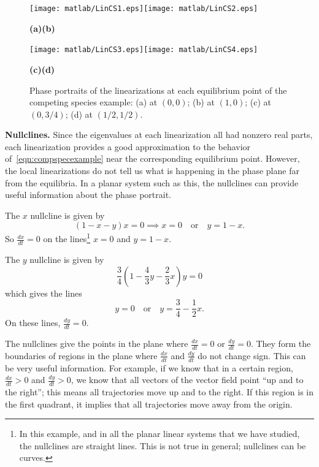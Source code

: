 \documentclass[reqno]{immbook}
\numberwithin{equation}{chapter}
\numberwithin{question}{section}
\numberwithin{theorem}{chapter}
\numberwithin{figure}{chapter}
\theoremstyle{definition}
\begin{document}

\begin{figure}
\centerline{\texttt{[image: matlab/LinCS1.eps]}\texttt{[image: matlab/LinCS2.eps]}}
\vspace{-0.2in}
\centerline{\hspace{0.2in}\textbf{(a)}\hspace{2.1in}\textbf{(b)}}
\centerline{\texttt{[image: matlab/LinCS3.eps]}\texttt{[image: matlab/LinCS4.eps]}}
\vspace{-0.2in}
\centerline{\hspace{0.2in}\textbf{(c)}\hspace{2.1in}\textbf{(d)}}
\caption{Phase portraits of the linearizations at each equilibrium point
of the competing species example:
(a) at $(0,0)$; (b) at $(1,0)$; (c) at $(0,3/4)$; (d) at $(1/2,1/2)$.}
\label{fig:CompSpecLinPlots}
\end{figure}


\noindent
\textbf{Nullclines.}
Since the eigenvalues at each linearization
all had nonzero real parts, each linearization
provides a good approximation to the behavior
of~\eqref{eqn:compspecexample} near the corresponding
equilibrium point.
However, the local linearizations do not tell us what is
happening in the phase plane far from the equilibria.
In a planar system such as this, the nullclines
can provide useful information about the phase portrait.

The $x$ nullcline is given by
\begin{equation}
   (1-x-y)x = 0 \implies x=0 \quad\textrm{or}\quad y = 1-x.
\end{equation}
So $\frac{dx}{dt}=0$ on the lines\footnote{In this example, and in all
the planar linear systems that we have studied,
the nullclines are straight lines. This is not true in general;
nullclines can be curves.}
$x=0$ and $y=1-x$.

The $y$ nullcline is given by
\begin{equation}
  \frac{3}{4}\left(1-\frac{4}{3}y - \frac{2}{3} x\right)y = 0
\end{equation}
which gives the lines
\begin{equation}
  y = 0 \quad \textrm{or} \quad y = \frac{3}{4} - \frac{1}{2}x.
\end{equation}
On these lines, $\frac{dy}{dt}=0$.

The nullclines give the points in the plane where 
$\frac{dx}{dt}=0$ or $\frac{dy}{dt}=0$.
They form the boundaries of regions in the plane
where $\frac{dx}{dt}$ and $\frac{dy}{dt}$ do not change sign.
This can be very useful information.
For example, if we know that in a certain region,
$\frac{dx}{dt} > 0$ and $\frac{dy}{dt}>0$, we know that all
vectors of the vector field point ``up and to the right'';
this means all trajectories move up and to the right.
If this region is in the first quadrant, it implies that
all trajectories move away from the origin.
\end{document}
